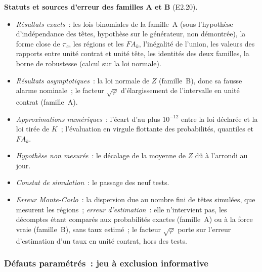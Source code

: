 \documentclass[a4paper,11pt]{article}
\begin{document}
\begin{encadre}
\small
\textbf{Statuts et sources d'erreur des familles A et B} (E2.20).
\begin{itemize}[leftmargin=*, itemsep=1pt, topsep=2pt]
  \item \emph{Résultats exacts}~: les lois binomiales de la famille~A
    (sous l'hypothèse d'indépendance des têtes, hypothèse sur le
    générateur, non démontrée), la forme close de $\pi_c$, les régions et les $FA_k$, l'inégalité de
    l'union, les valeurs des rapports entre unité contrat et unité tête,
    les identités des deux familles, la borne de robustesse (calcul sur la
    loi normale).
  \item \emph{Résultats asymptotiques}~: la loi normale de $Z$
    (famille~B), donc sa fausse alarme nominale~; le facteur
    $\sqrt{\varphi}$ d'élargissement de l'intervalle en unité contrat
    (famille~A).
  \item \emph{Approximations numériques}~: l'écart d'au plus $10^{-12}$
    entre la loi déclarée et la loi tirée de $K$~; l'évaluation en virgule
    flottante des probabilités, quantiles et $FA_k$.
  \item \emph{Hypothèse non mesurée}~: le décalage de la moyenne de $Z$ dû
    à l'arrondi au jour.
  \item \emph{Constat de simulation}~: le passage des neuf tests.
  \item \emph{Erreur Monte-Carlo}~: la dispersion due au nombre fini de
    têtes simulées, que mesurent les régions~; \emph{erreur d'estimation}~:
    elle n'intervient pas, les décomptes étant comparés aux probabilités
    exactes (famille~A) ou à la force vraie (famille~B), sans taux
    estimé~; le facteur $\sqrt{\varphi}$ porte sur l'erreur d'estimation
    d'un taux en unité contrat, hors des tests.
\end{itemize}
\end{encadre}

\subsubsection*{Défauts paramétrés~: jeu à exclusion informative}
\end{document}
